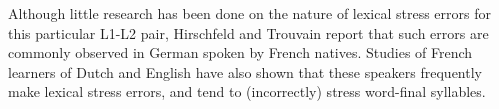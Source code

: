 \documentclass[a4paper]{article}
\begin{document}
Although little research has been done on the nature of lexical stress errors for this particular L1-L2 pair, Hirschfeld and Trouvain \cite{Hirschfeld2007} report that such errors are commonly observed in German spoken by French natives.
Studies of French learners of Dutch \cite{Michaux2013} and English \cite{Bonneau2011} have also shown that these speakers frequently make lexical stress errors, and tend to (incorrectly) stress word-final syllables. %
\end{document}
